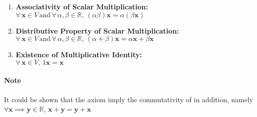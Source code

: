 \documentclass[11pt]{article}
\begin{document}
\begin{definition}
\begin{enumerate}
\begin{enumerate}
            \item \textbf{Associativity of Scalar Multiplication:} \\
            $\forall \, \textbf{x} \in V \, \text{and} \, \forall \, \alpha, \beta \in \mathbb{R}, \, (\alpha \beta) \textbf{x} = \alpha (\beta \textbf{x})$
            
            \item \textbf{Distributive Property of Scalar Multiplication:} \\
            $\forall \, \textbf{x} \in V \, \text{and} \, \forall \, \alpha, \beta \in \mathbb{R}, \, (\alpha + \beta) \textbf{x} = \alpha \textbf{x} + \beta \textbf{x}$
            
            \item \textbf{Existence of Multiplicative Identity:} \\
            $\forall \, \textbf{x} \in V, \, 1 \textbf{x} = \textbf{x}$
        \end{enumerate}
    \end{enumerate}
     
    \paragraph{Note} It could be shown that the axiom imply the commutativity of in addition, namely $\forall \textbf{x} \implies \textbf{y} \in \mathbb{R}$, $\textbf{x} + \textbf{y} = \textbf{y} + \textbf{x}$
\end{definition}
\end{document}
